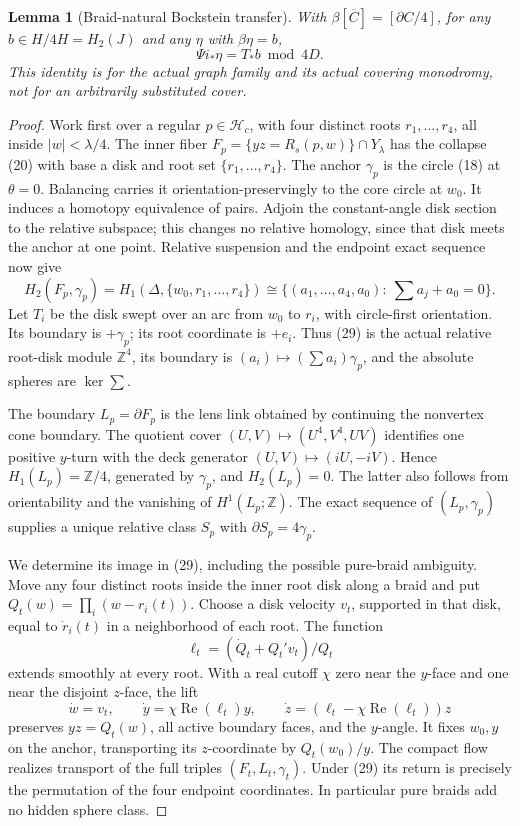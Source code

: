 \documentclass[11pt]{article}
\newtheorem{lemma}{Lemma}
\newcommand{\Z}{\mathbb Z}
\newcommand{\calH}{\mathcal H}
\begin{document}
\begin{lemma}[Braid-natural Bockstein transfer]\label{lem:transfer}
With \(\beta[\overline C]=[\partial C/4]\), for any
\(b\in H/4H=H_2(J)\) and any \(\eta\) with \(\beta\eta=b\),
\[
                       \Psi i_*\eta=T_*b\bmod4D.  \tag{28}
\]
This identity is for the actual graph family and its actual
covering monodromy, not for an arbitrarily substituted cover.
\end{lemma}
\begin{proof}
Work first over a regular \(p\in\calH_c\), with four distinct
roots \(r_1,\ldots,r_4\), all inside \(|w|<\lambda/4\).
The inner fiber \(F_p=\{yz=R_s(p,w)\}\cap Y_\lambda\)
has the collapse (20) with base a disk and root set
\(\{r_1,\ldots,r_4\}\). The anchor \(\gamma_p\) is the
circle (18) at \(\theta=0\). Balancing carries it
orientation-preservingly to the core circle at \(w_0\).
It induces a homotopy equivalence of pairs.
Adjoin the constant-angle disk section to the relative
subspace; this changes no relative homology, since that disk
meets the anchor at one point.
Relative suspension and the endpoint exact sequence now give
\[
 H_2(F_p,\gamma_p)=
 H_1(\Delta,\{w_0,r_1,\ldots,r_4\})
 \cong\{(a_1,\ldots,a_4,a_0):\ \sum a_j+a_0=0\}.
                                                               \tag{29}
\]
Let \(T_i\) be the disk swept over an arc from \(w_0\) to \(r_i\),
with circle-first orientation. Its boundary is \(+\gamma_p\);
its root coordinate is \(+e_i\). Thus (29) is the actual
relative root-disk module \(\Z^4\), its boundary is
\((a_i)\mapsto(\sum a_i)\gamma_p\), and the absolute
spheres are \(\ker\sum\).

The boundary \(L_p=\partial F_p\) is the lens link obtained
by continuing the nonvertex cone boundary. The quotient cover
\((U,V)\mapsto(U^4,V^4,UV)\) identifies one positive \(y\)-turn
with the deck generator \((U,V)\mapsto(iU,-iV)\).
Hence \(H_1(L_p)=\Z/4\), generated by \(\gamma_p\), and
\(H_2(L_p)=0\). The latter also follows from orientability
and the vanishing of \(H^1(L_p;\Z)\).
The exact sequence of \((L_p,\gamma_p)\) supplies a unique
relative class \(S_p\) with \(\partial S_p=4\gamma_p\).

We determine its image in (29), including the possible pure-braid
ambiguity. Move any four distinct roots inside the inner root
disk along a braid and put \(Q_t(w)=\prod_i(w-r_i(t))\).
Choose a disk velocity \(v_t\), supported in that disk, equal
to \(\dot r_i(t)\) in a neighborhood of each root. The function
\[
                 \ell_t=(\dot Q_t+Q_t'v_t)/Q_t
\]
extends smoothly at every root. With a real cutoff \(\chi\)
zero near the \(y\)-face and one near the disjoint \(z\)-face,
the lift
\[
 \dot w=v_t,\qquad
 \dot y=\chi\operatorname{Re}(\ell_t)y,\qquad
 \dot z=(\ell_t-\chi\operatorname{Re}(\ell_t))z       \tag{30}
\]
preserves \(yz=Q_t(w)\), all active boundary faces, and the
\(y\)-angle. It fixes \(w_0,y\) on the anchor, transporting
its \(z\)-coordinate by \(Q_t(w_0)/y\).
The compact flow realizes transport of the full triples
\((F_t,L_t,\gamma_t)\). Under (29) its return is precisely
the permutation of the four endpoint coordinates.
In particular pure braids add no hidden sphere class.


\end{proof}
\end{document}
